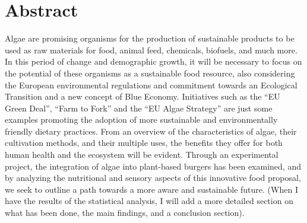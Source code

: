 \section*{Abstract}
Algae are promising organisms for the production of sustainable products to be used as raw materials for food, animal feed, chemicals, biofuels, and much more. In this period of change and demographic growth, it will be necessary to focus on the potential of these organisms as a sustainable food resource, also considering the European environmental regulations and commitment towards an Ecological Transition and a new concept of Blue Economy.
Initiatives such as the “EU Green Deal”, “Farm to Fork” and the “EU Algae Strategy” are just some examples promoting the adoption of more sustainable and environmentally friendly dietary practices. %
From an overview of the characteristics of algae, their cultivation methods, and their multiple uses, the benefits they offer for both human health and the ecosystem will be evident. Through an experimental project, the integration of algae into plant-based burgers has been examined, and by analyzing the nutritional and sensory aspects of this innovative food proposal, we seek to outline a path towards a more aware and sustainable future.
(When I have the results of the statistical analysis, I will add a more detailed section on what has been done, the main findings, and a conclusion section).

